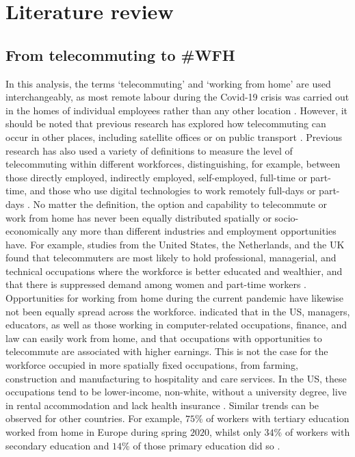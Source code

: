 \documentclass[]{interact}
\theoremstyle{plain}%
\theoremstyle{definition}
\theoremstyle{remark}
\begin{document}
\hypertarget{sec:2}{%
\section{Literature review}\label{sec:2}}

\hypertarget{sec:2.1}{%
\subsection{From telecommuting to \#WFH}\label{sec:2.1}}

In this analysis, the terms `telecommuting' and `working from home' are
used interchangeably, as most remote labour during the Covid-19 crisis
was carried out in the homes of individual employees rather than any
other location \citep{eurofound2020}. However, it should be noted that
previous research has explored how telecommuting can occur in other
places, including satellite offices or on public transport
\citep{felstead2012rapid, siha2006telecommuting}. Previous research has
also used a variety of definitions to measure the level of telecommuting
within different workforces, distinguishing, for example, between those
directly employed, indirectly employed, self-employed, full-time or
part-time, and those who use digital technologies to work remotely
full-days or part-days
\citep{allen2015effective, bailey2002review, haddad2009examination}. No
matter the definition, the option and capability to telecommute or work
from home has never been equally distributed spatially or
socio-economically any more than different industries and employment
opportunities have. For example, studies from the United States, the
Netherlands, and the UK found that telecommuters are most likely to hold
professional, managerial, and technical occupations where the workforce
is better educated and wealthier, and that there is suppressed demand
among women and part-time workers
\citep{headicar2016move, peters2004employees, singh2013modeling}.
Opportunities for working from home during the current pandemic have
likewise not been equally spread across the workforce.
\citet{NBERw26948} indicated that in the US, managers, educators, as
well as those working in computer-related occupations, finance, and law
can easily work from home, and that occupations with opportunities to
telecommute are associated with higher earnings. This is not the case
for the workforce occupied in more spatially fixed occupations, from
farming, construction and manufacturing to hospitality and care
services. In the US, these occupations tend to be lower-income,
non-white, without a university degree, live in rental accommodation and
lack health insurance \citep{NBERw27085}. Similar trends can be observed
for other countries. For example, \(75\)\% of workers with tertiary
education worked from home in Europe during spring \(2020\), whilst only
\(34\)\% of workers with secondary education and \(14\)\% of those
primary education did so \citep{eurofound2020}.
\end{document}
